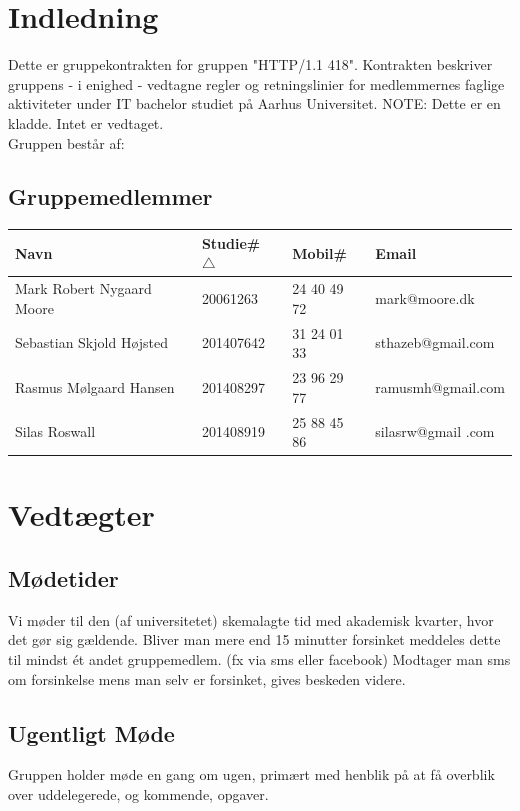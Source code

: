 \documentclass[a4paper,oneside,article]{memoir}
\date {04. februar 2015}
\begin{document}

\section{Indledning}
Dette er gruppekontrakten for gruppen "HTTP/1.1 418".
Kontrakten beskriver gruppens - i enighed - vedtagne regler og retningslinier for medlemmernes faglige aktiviteter under IT bachelor studiet på Aarhus Universitet.
NOTE: Dette er en kladde. Intet er vedtaget.\\
Gruppen består af:
\subsection{Gruppemedlemmer}
\begin{tabular}{ l | l | l | l }
    Navn & Studie\# $\triangle$ & Mobil\# & Email \\ \hline
    Mark Robert Nygaard Moore & 20061263 & 24 40 49 72 & mark@moore.dk \\ \hline
    Sebastian Skjold Højsted & 201407642 & 31 24 01 33 & sthazeb@gmail.com \\ \hline
	Rasmus Mølgaard Hansen & 201408297 & 23 96 29 77 & ramusmh@gmail.com \\ \hline
    Silas Roswall & 201408919 & 25 88 45 86 & silasrw@gmail .com
\end{tabular}
\label{subsec:medlemmer}
\section{Vedtægter}
\subsection{Mødetider}
Vi møder til den (af universitetet) skemalagte tid med akademisk kvarter, hvor det gør sig gældende.
Bliver man mere end 15 minutter forsinket meddeles dette til mindst ét andet gruppemedlem. (fx via sms eller facebook)
Modtager man sms om forsinkelse mens man selv er forsinket, gives beskeden videre.
\subsection{Ugentligt Møde}
Gruppen holder møde en gang om ugen, primært med henblik på at få overblik over uddelegerede, og kommende, opgaver.
\end{document}
